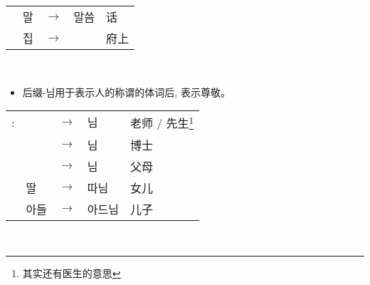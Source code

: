 \begin{grammar}
\begin{grammarsect}[\kr -(으){}시-]
\begin{tabular}{lllll}
			                 & \kr 말 & $\to$ & \kr 말씀          & 话  \\
			                 & \kr 집 & $\to$ & \kr \ruby{宅}{댁} & 府上
		\end{tabular}\\
		\begin{itemize}
			\item 后缀{\kr -님}用于表示人的称谓的体词后, 表示尊敬。
		\end{itemize}
		\begin{tabular}{lllll}
			\kr \ruby{例}{예}: & \kr \ruby{先生}{선생} & $\to$ & \kr  \ruby{先生}{선생}님 & 老师 / 先生\footnote{其实还有医生的意思} \\
			                 & \kr \ruby{博士}{박사} & $\to$ & \kr  \ruby{博士}{박사}님 & 博士                          \\
			                 & \kr \ruby{父母}{부모} & $\to$ & \kr  \ruby{父母}{부모}님 & 父母                          \\
			                 & \kr 딸             & $\to$ & \kr  따님             & 女儿                          \\
			                 & \kr 아들            & $\to$ & \kr  아드님            & 儿子
		\end{tabular}\\
	\end{grammarsect}
\end{grammar}
